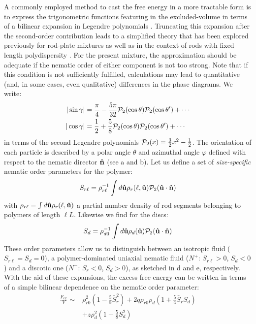 A commonly employed method to cast the free energy in a more tractable form is to express the trigonometric functions featuring in the excluded-volume  in terms of a bilinear expansion in Legendre polynomials \cite{lakatos,kayser,lekkerkerker84}. Truncating this expansion after the second-order contribution leads to a simplified theory that has been explored previously for rod-plate mixtures \cite{stroobants1984,jacksonbiax} as well as in the context of  rods with fixed length polydispersity \cite{sollichonsagerP2}. For the present mixture, the approximation should be adequate if the nematic order of either component is not too strong. Note that if this condition is not sufficiently fulfilled, calculations may lead to quantitative (and, in some cases, even qualitative) differences in the phase diagrams. We  write:
\begin{align}
| \sin \gamma | &= \frac{\pi}{4} - \frac{5 \pi }{32} {\mathcal P}_{2}(\cos \theta) {\mathcal P}_{2}(\cos \theta^{\prime}) + \cdots \nonumber \\
| \cos \gamma | &= \frac{1}{2} + \frac{5 }{8} {\mathcal P}_{2}(\cos \theta) {\mathcal P}_{2}(\cos \theta^{\prime}) + \cdots
\label{p2expansion}
 \end{align}
in terms of the second Legendre polynomials ${\mathcal P}_{2}(x) = \frac{3}{2} x^{2} - \frac{1}{2}$. The  orientation of each particle is described by a polar angle $\theta$ and azimuthal angle $\varphi$ defined with respect to the nematic director ${\bf \hat{n}}$ (see a and b). Let us define a set of  {\em size-specific} nematic order parameters for the polymer:
\begin{align}
S_{r \ell} = \rho_{r \ell}^{-1} \int d {\bf \hat{u}} \rho_{r}(\ell, {\bf \hat{u}}) {\mathcal P}_{2} ({\bf \hat{u}} \cdot {\bf \hat{n}}) 
\label{sr} 
\end{align}
with $\rho_{r \ell } = \int d {\bf \hat{u}} \rho_{r} (\ell, {\bf \hat{u}})$ a partial number density of rod segments belonging to polymers of length $\ell L$. Likewise we find for the discs:
\begin{align}
S_{d} = \rho_{d0}^{-1} \int d {\bf \hat{u}} \rho_{d}( {\bf \hat{u}}) {\mathcal P}_{2} ({\bf \hat{u}} \cdot {\bf \hat{n}}) 
\end{align}
These order parameters allow us to distinguish between an isotropic fluid ($S_{r \ell}=S_{d}=0$), a polymer-dominated uniaxial nematic fluid ($N^{+}$: $S_{r \ell} > 0$, $S_{d} <0$) and a discotic one ($N^{-}$: $S_{r} < 0$, $S_{d} >0$), as sketched in d and e, respectively.  With the aid of these expansions, the excess free energy can be written in terms of a simple bilinear dependence on the nematic order parameter:
\begin{align}
 \frac{F_{ex}}{ V}   \sim & \rho_{r0}^{2}   \left ( 1 - \frac{5}{8}  \bar{S}_{r }^{2} \right ) +  2 q \rho_{r 0} \rho_{d}   \left ( 1 + \frac{5}{4} \bar{S}_{r} S_{d}   \right ) \nonumber \\
& + z \rho_{d}^{2}  \left ( 1 - \frac{5}{8} S_{d}^{2}  \right ) 
\label{fexsim}
 \end{align}
